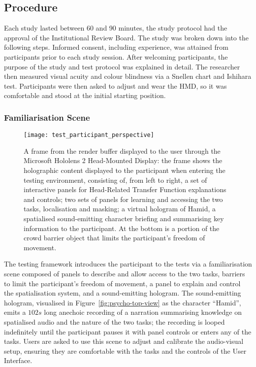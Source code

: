 \subsection{Procedure}\label{sec:psy-procedure}
Each study lasted between 60 and 90 minutes, the study protocol had the approval of the Institutional Review Board. The study was broken down into the following steps. Informed consent, including experience, was attained from participants prior to each study session. After welcoming participants, the purpose of the study and test protocol was explained in detail. The researcher then measured visual acuity and colour blindness via a Snellen chart and Ishihara test. Participants were then asked to adjust and wear the HMD, so it was comfortable and stood at the initial starting position. 

\subsubsection{Familiarisation Scene}
\begin{figure}[htbp]
    \centering
    \texttt{[image: test\_participant\_perspective]}
    \caption[Participant's perspective of psychoacoustic testing --- familiarisation]{A frame from the render buffer displayed to the user through the Microsoft Hololens 2 Head-Mounted Display: the frame shows the holographic content displayed to the participant when entering the testing environment, consisting of, from left to right, a set of interactive panels for Head-Related Transfer Function explanations and controls; two sets of panels for learning and accessing the two tasks, localisation and masking; a virtual hologram of Hamid, a spatialised sound-emitting character briefing and summarising key information to the participant. At the bottom is a portion of the crowd barrier object that limits the participant's freedom of movement.}\label{fig:test-participant-perspective}
\end{figure}
The testing framework introduces the participant to the tests via a familiarisation scene composed of panels to describe and allow access to the two tasks, barriers to limit the participant's freedom of movement, a panel to explain and control the spatialisation system, and a sound-emitting hologram. The sound-emitting hologram, visualised in Figure~\ref{fig:psycho-top-view} as the character ``Hamid'', emits a $102s$ long anechoic recording of a narration summarising knowledge on spatialised audio and the nature of the two tasks; the recording is looped indefinitely until the participant pauses it with panel controls or enters any of the tasks. Users are asked to use this scene to adjust and calibrate the audio-visual setup, ensuring they are comfortable with the tasks and the controls of the User Interface. \par
